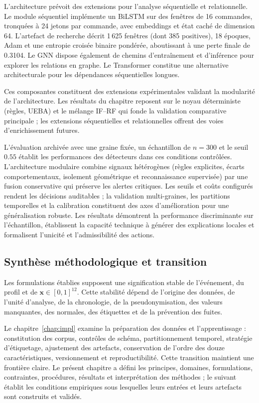 \documentclass[11pt,a4paper,oneside]{report}
\theoremstyle{definition}
\theoremstyle{plain}
\begin{document}
L'architecture prévoit des extensions pour l'analyse séquentielle et relationnelle.
Le module séquentiel implémente un BiLSTM sur des fenêtres de 16 commandes,
tronquées à 24 jetons par commande, avec embeddings et état caché de dimension 64.
L'artefact de recherche décrit 1\,625 fenêtres (dont 385 positives), 18 époques,
Adam et une entropie croisée binaire pondérée, aboutissant à une perte finale de
0.3104. Le GNN dispose également de chemins d'entraînement et d'inférence pour
explorer les relations en graphe. Le Transformer constitue une alternative
architecturale pour les dépendances séquentielles longues.

Ces composantes constituent des extensions expérimentales validant la modularité
de l'architecture. Les résultats du chapitre reposent sur le noyau déterministe
(règles, UEBA) et le mélange IF--RF qui fonde la validation comparative
principale ; les extensions séquentielles et relationnelles offrent des voies
d'enrichissement futures.

L'évaluation archivée avec une graine fixée, un échantillon de $n=300$ et le
seuil $0.55$ établit les performances des détecteurs dans ces conditions
contrôlées. L'architecture modulaire combine signaux hétérogènes (règles
explicites, écarts comportementaux, isolement géométrique et reconnaissance
supervisée) par une fusion conservative qui préserve les alertes critiques. Les
seuils et coûts configurés rendent les décisions auditables ; la validation
multi-graines, les partitions temporelles et la calibration constituent des
axes d'amélioration pour une généralisation robuste. Les résultats démontrent
la performance discriminante sur l'échantillon, établissent la capacité
technique à générer des explications locales et formalisent l'unicité et
l'admissibilité des actions.

\subsection{Synthèse méthodologique et transition}
\label{sec:ai-ro-transition-data}

Les formulations établies supposent une signification stable de l'événement, du
profil et de $\mathbf{x}\in[0,1]^{12}$. Cette stabilité dépend de l'origine des
données, de l'unité d'analyse, de la chronologie, de la pseudonymisation, des
valeurs manquantes, des normales, des étiquettes et de la prévention des fuites.

Le chapitre~\ref{chap:impl} examine la préparation des données et l'apprentissage :
constitution des corpus, contrôles de schéma, partitionnement temporel, stratégie
d'étiquetage, ajustement des artefacts, conservation de l'ordre des douze
caractéristiques, versionnement et reproductibilité. Cette transition maintient
une frontière claire. Le présent chapitre a défini les principes, domaines,
formulations, contraintes, procédures, résultats et interprétation des méthodes ;
le suivant établit les conditions empiriques sous lesquelles leurs entrées et
leurs artefacts sont construits et validés.
\end{document}
